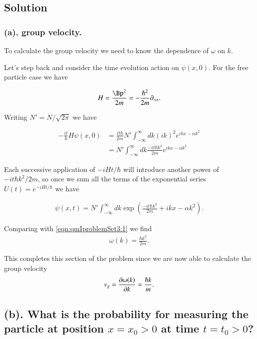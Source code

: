 \subsection{Solution}
\subsubsection{(a).  group velocity.}

To calculate the group velocity we need to know the dependence of $\omega$ on $k$.

Let's step back and consider the time evolution action on $\psi(x,0)$.  For the free particle case we have

\begin{align}\label{eqn:qmIproblemSet3:101}
H = \frac{\Bp^2}{2m} = -\frac{\hbar^2}{2m} \partial_{xx}.
\end{align}

Writing $N' = N/\sqrt{2\pi}$ we have

\begin{align*}
-\frac{i t}{\hbar} H \psi(x,0) 
&= 
\frac{i t \hbar }{2m} 
N' \int_{-\infty}^\infty dk (i k)^2 e^{i k x - \alpha k^2} \\
&= 
N' \int_{-\infty}^\infty dk \frac{-i t \hbar k^2}{2m} e^{i k x - \alpha k^2}
\end{align*}

Each successive application of $-iHt/\hbar$ will introduce another power of $-it\hbar k^2/2 m$, so once we sum all the terms of the exponential series $U(t) = e^{-iHt/\hbar}$ we have

\begin{align}\label{eqn:qmIproblemSet3:102}
\psi(x,t) =
N' \int_{-\infty}^\infty dk \exp\left( 
\frac{-i t \hbar k^2}{2m} + i k x - \alpha k^2 \right).
\end{align}

Comparing with \ref{eqn:qmIproblemSet3:1} we find
\begin{align}\label{eqn:qmIproblemSet3:103}
\omega(k) = \frac{\hbar k^2}{2m}.
\end{align}

This completes this section of the problem since we are now able to calculate the group velocity 
\begin{align}\label{eqn:qmIproblemSet3:104}
v_g = \PD{k}{\omega(k)} = \frac{\hbar k}{m}.
\end{align}

\subsection{(b). What is the probability for measuring the particle at position $x=x_0>0$ at time $t=t_0>0$? }


